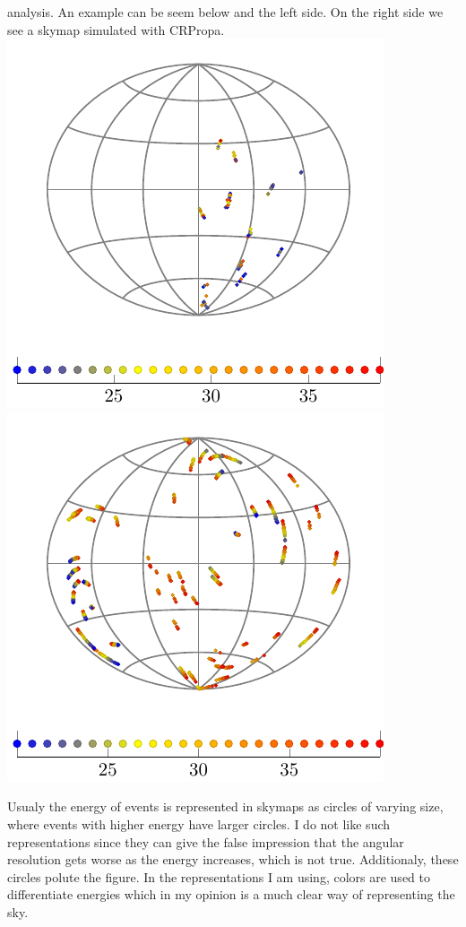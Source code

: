 \documentclass[12pt]{article}
\begin{document}
analysis. An example can be seem below and the left side. On the right side we
see a skymap simulated with CRPropa. \\
\includegraphics[scale=1.0]{mult-cand.pdf} 
\includegraphics[scale=1.0]{crpropa.pdf}

Usualy the energy of events is represented in skymaps as circles of varying
size, where events with higher energy have larger circles. I do not like such
representations since they can give the false impression that the angular
resolution gets worse as the energy increases, which is not true. Additionaly,
these circles polute the figure. In the representations I am using, colors
are used to differentiate energies which in my opinion is a much clear way of
representing the sky.
\end{document}
